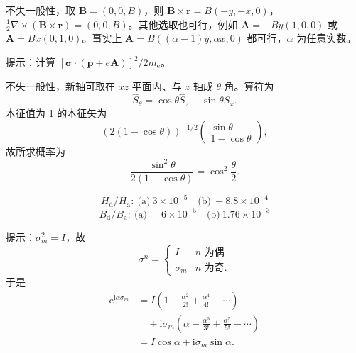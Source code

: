  不失一般性，取 $\mathbf{B}=(0,0,B)$，则 $\mathbf{B}\times\mathbf{r}=B(-y,-x,0)$，
$\frac{1}{2}\nabla\times(\mathbf{B}\times\mathbf{r})=(0,0,B)$。其他选取也可行，例如
$\mathbf{A}=-By(1,0,0)$ 或 $\mathbf{A}=Bx(0,1,0)$。事实上
$\mathbf{A}=B((\alpha-1)y,\alpha x,0)$ 都可行，$\alpha$ 为任意实数。

 提示：计算 $[\boldsymbol{\sigma}\cdot(\mathbf{p}+e\mathbf{A})]^{2}/2m_{\mathrm{e}}$。

 不失一般性，新轴可取在 $xz$ 平面内、与 $z$ 轴成 $\theta$ 角。算符为
\begin{equation*}
\hat{S}_{\theta} = \cos\theta\hat{S}_z + \sin\theta\hat{S}_x.\tag{F.9}
\end{equation*}
本征值为 1 的本征矢为
\begin{equation*}
(2(1-\cos\theta))^{-1/2}\begin{pmatrix}\sin\theta\\1-\cos\theta\end{pmatrix},\tag{F.10}
\end{equation*}
故所求概率为
\begin{equation*}
\frac{\sin^{2}\theta}{2(1-\cos\theta)} = \cos^{2}\frac{\theta}{2}.\tag{F.11}
\end{equation*}

\begin{equation*}
H_{\mathrm{d}}/H_{\mathrm{a}}:\ \text{(a)}\ 3\times10^{-5}\quad \text{(b)}\ -8.8\times10^{-4}
\end{equation*}
\begin{equation*}
B_{\mathrm{d}}/B_{\mathrm{a}}:\ \text{(a)}\ -6\times10^{-5}\quad \text{(b)}\ 1.76\times10^{-3}
\end{equation*}

 提示：$\sigma_m^{2}=I$，故
\begin{equation*}
\sigma^{n} = \begin{cases} I & n \text{ 为偶}\\ \sigma_m & n \text{ 为奇}. \end{cases}\tag{F.12}
\end{equation*}
于是
\begin{align*}
\mathrm{e}^{\mathrm{i}\alpha\sigma_m} &= I\left(1-\frac{\alpha^{2}}{2!}+\frac{\alpha^{4}}{4!}-\cdots\right)\\
&\quad + \mathrm{i}\sigma_m\left(\alpha-\frac{\alpha^{3}}{3!}+\frac{\alpha^{5}}{5!}-\cdots\right)\\
&= I\cos\alpha + \mathrm{i}\sigma_m\sin\alpha.\tag{F.13}
\end{align*}

